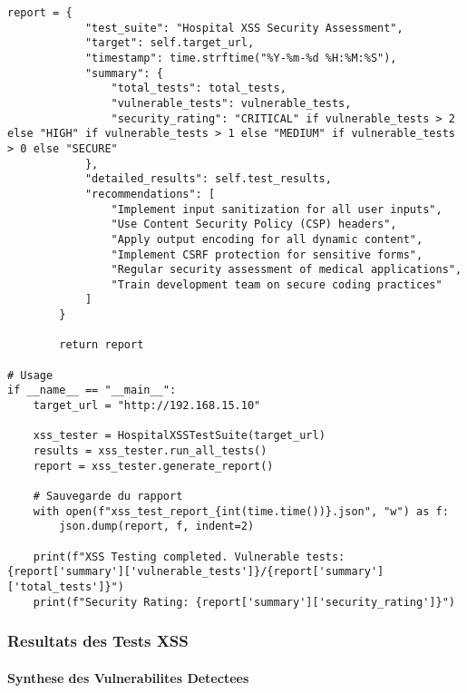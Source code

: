 \begin{lstlisting}[style=pythonstyle,caption=Suite de tests XSS automatises pour application medicale]
        report = {
            "test_suite": "Hospital XSS Security Assessment",
            "target": self.target_url,
            "timestamp": time.strftime("%Y-%m-%d %H:%M:%S"),
            "summary": {
                "total_tests": total_tests,
                "vulnerable_tests": vulnerable_tests,
                "security_rating": "CRITICAL" if vulnerable_tests > 2 else "HIGH" if vulnerable_tests > 1 else "MEDIUM" if vulnerable_tests > 0 else "SECURE"
            },
            "detailed_results": self.test_results,
            "recommendations": [
                "Implement input sanitization for all user inputs",
                "Use Content Security Policy (CSP) headers",
                "Apply output encoding for all dynamic content",
                "Implement CSRF protection for sensitive forms",
                "Regular security assessment of medical applications",
                "Train development team on secure coding practices"
            ]
        }
        
        return report

# Usage
if __name__ == "__main__":
    target_url = "http://192.168.15.10"
    
    xss_tester = HospitalXSSTestSuite(target_url)
    results = xss_tester.run_all_tests()
    report = xss_tester.generate_report()
    
    # Sauvegarde du rapport
    with open(f"xss_test_report_{int(time.time())}.json", "w") as f:
        json.dump(report, f, indent=2)
    
    print(f"XSS Testing completed. Vulnerable tests: {report['summary']['vulnerable_tests']}/{report['summary']['total_tests']}")
    print(f"Security Rating: {report['summary']['security_rating']}")
\end{lstlisting}

\subsubsection{Resultats des Tests XSS}

\paragraph{Synthese des Vulnerabilites Detectees}

